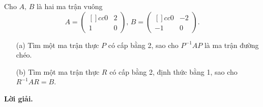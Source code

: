 \begin{tcolorbox}[title=\textbf{Bài toán B.2.}]
    Cho $A,\,B$ là hai ma trận vuông $$A = \begin{pmatrix}[]{cc}
        0 & 2 \\
        1 & 0 
    \end{pmatrix},\,B = \begin{pmatrix}[]{cc}
        0 & -2 \\
        -1 & 0 
    \end{pmatrix}.$$

    \begin{enumerate}
        \item[(a)] Tìm một ma trận thực $P$ có cấp bằng 2, sao cho $P^{-1}AP$ là ma trận đường chéo.
        \item[(b)] Tìm một ma trận thực $R$ có cấp bằng 2, định thức bằng 1, sao cho $R^{-1}AR = B$.
    \end{enumerate}
\end{tcolorbox}

\textbf{Lời giải.}

